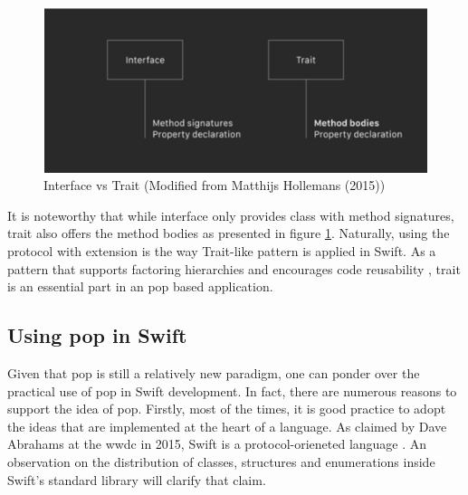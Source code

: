 \documentclass[11pt,a4paper,oneside,article]{memoir}
\begin{document}
\begin{figure}[H]


\centering
\includegraphics[width=\textwidth]{interfaceVsTrait}

\caption{Interface vs Trait (Modified from Matthijs Hollemans (2015)\cite{machinethink:pattern})}
\label{fig:interfaceVsTrait}


\end{figure}

It is noteworthy that while \gls{interface} only provides class with method signatures, \gls{trait} also offers the method bodies as presented in figure \ref{fig:interfaceVsTrait}. Naturally, using the protocol with extension is the way Trait-like pattern is applied in Swift. As a pattern that supports factoring hierarchies and encourages code reusability \cite{typed:trait}, \gls{trait} is an essential part in an \gls{pop} based application. 

\subsection{Using \acrfull{pop} in Swift}
Given that \gls{pop} is still a relatively new paradigm, one can ponder over the practical use of \gls{pop} in Swift development. In fact, there are numerous reasons to support the idea of \gls{pop}. Firstly, most of the times, it is good practice to adopt the ideas that are implemented at the heart of a language. As claimed by Dave Abrahams at the \gls{wwdc} in 2015, Swift is a protocol-orieneted language \cite{pop:wwdc}. An observation on the distribution of classes, structures and enumerations inside Swift's standard library will clarify that claim.

\end{document}
